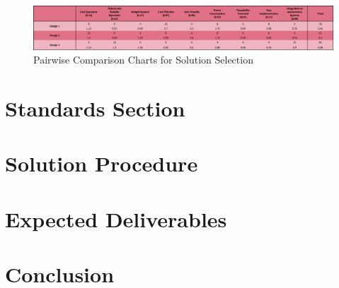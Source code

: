 \documentclass[a4paper,12pt]{article}
\begin{document}
	\begin{figure}[H]
		\centering
		\includegraphics[width=\textwidth,height=\textheight,keepaspectratio]{images/soln_selection} 
		\caption{\label{fig:soln_selection}Pairwise Comparison Charts for Solution Selection}
	\end{figure}





	

\section{Standards Section}


\section{Solution Procedure}


\section{Expected Deliverables}


\section{Conclusion}

\newpage
\begin{appendices}
	
		
		

	
\end{appendices}
\end{document}
